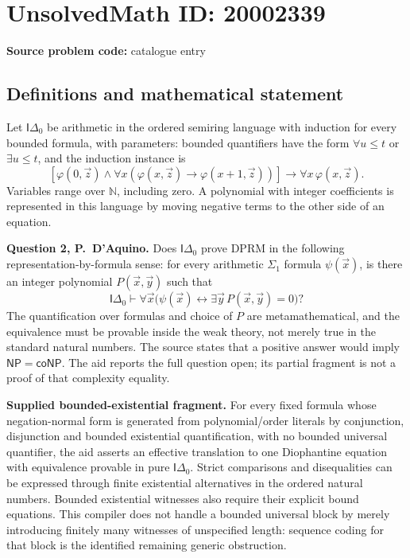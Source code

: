 \documentclass[11pt]{article}
\newcommand{\N}{\mathbb{N}}
\begin{document}
\section*{UnsolvedMath ID: 20002339}
\textbf{Source problem code:} catalogue entry
\subsection{Definitions and mathematical statement}
Let $\mathsf I\Delta_0$ be arithmetic in the ordered semiring language with induction for every bounded formula, with parameters: bounded quantifiers have the form $\forall u\le t$ or $\exists u\le t$, and the induction instance is
\[
 [\varphi(0,\vec z)\wedge\forall x(\varphi(x,\vec z)\to\varphi(x+1,\vec z))]
       \to\forall x\,\varphi(x,\vec z).
\]
Variables range over $\N$, including zero. A polynomial with integer coefficients is represented in this language by moving negative terms to the other side of an equation.

\textbf{Question 2, P.~D'Aquino.} Does $\mathsf I\Delta_0$ prove DPRM in the following representation-by-formula sense: for every arithmetic $\Sigma_1$ formula $\psi(\vec x)$, is there an integer polynomial $P(\vec x,\vec y)$ such that
\[
 \mathsf I\Delta_0\vdash
 \forall\vec x\bigl(\psi(\vec x)\leftrightarrow
                         \exists\vec y\,P(\vec x,\vec y)=0\bigr)?
\]
The quantification over formulas and choice of $P$ are metamathematical, and the equivalence must be provable inside the weak theory, not merely true in the standard natural numbers. The source states that a positive answer would imply $\mathsf{NP}=\mathsf{coNP}$. The aid reports the full question open; its partial fragment is not a proof of that complexity equality.

\textbf{Supplied bounded-existential fragment.} For every fixed formula whose negation-normal form is generated from polynomial/order literals by conjunction, disjunction and bounded existential quantification, with no bounded universal quantifier, the aid asserts an effective translation to one Diophantine equation with equivalence provable in pure $\mathsf I\Delta_0$. Strict comparisons and disequalities can be expressed through finite existential alternatives in the ordered natural numbers. Bounded existential witnesses also require their explicit bound equations. This compiler does not handle a bounded universal block by merely introducing finitely many witnesses of unspecified length: sequence coding for that block is the identified remaining generic obstruction.
\end{document}

